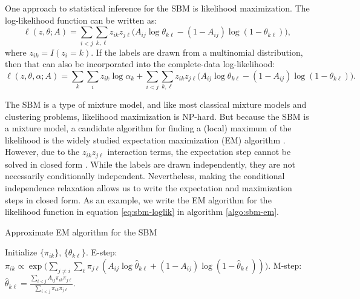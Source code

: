 \documentclass[
  12pt,
]{article}
\theoremstyle{definition}
\theoremstyle{definition}
\theoremstyle{definition}
\theoremstyle{definition}
\theoremstyle{remark}
\begin{document}
One approach to statistical inference for the SBM is likelihood maximization.
The log-likelihood function can be written as:
\begin{equation}
\label{eq:sbm-loglik}
\ell(z, \theta; A) = \sum_{i < j} \sum_{k, \ell} z_{ik} z_{j \ell} \big( 
A_{ij} \log \theta_{k \ell} - (1 - A_{ij}) \log (1 - \theta_{k \ell}) \big),
\end{equation}
where \(z_{ik} = I(z_i = k)\). If the labels are drawn from a multinomial distribution, then that can also be incorporated into the complete-data log-likelihood:
\begin{equation}
\label{eq:sbm-loglik-full}
\ell(z, \theta, \alpha; A) = \sum_k \sum_i z_{ik} \log \alpha_k + 
\sum_{i < j} \sum_{k, \ell} z_{ik} z_{j \ell} \big( 
A_{ij} \log \theta_{k \ell} - (1 - A_{ij}) \log (1 - \theta_{k \ell}) \big).
\end{equation}

The SBM is a type of mixture model, and like most classical mixture models and clustering problems, likelihood maximization is NP-hard.
But because the SBM is a mixture model, a candidate algorithm for finding a (local) maximum of the likelihood is the widely studied expectation maximization (EM) algorithm \citep{10.2307/2984875}.
However, due to the \(z_{ik} z_{j \ell}\) interaction terms, the expectation step cannot be solved in closed form \citep{kolaczyk2014statistical}.
While the labels are drawn independently, they are not necessarily conditionally independent.
Nevertheless, making the conditional independence relaxation allows us to write the expectation and maximization steps in closed form.
As an example, we write the EM algorithm for the likelihood function in equation \eqref{eq:sbm-loglik} in algorithm \ref{algo:sbm-em}.

\begin{algorithm}
\label{algo:sbm-em}
\DontPrintSemicolon
\SetAlgoLined
{}
\caption{Approximate EM algorithm for the SBM}
Initialize $\{\pi_{ik}\}$, $\{\theta_{k \ell}\}$.\;
\While{$\|\nabla \ell\| > \epsilon$} {
 {
 {
E-step: $\pi_{ik} \propto \exp \bigg( \sum_{j \neq i} \sum_{\ell} \pi_{j \ell} (A_{ij} \log \hat{\theta}_{k \ell} + (1 - A_{ij}) \log (1 - \hat{\theta}_{k \ell})) \bigg)$.\;
M-step: $\hat{\theta}_{k \ell} = \frac{\sum_{i < j} A_{ij} \pi_{ik} \pi_{j \ell}}{\sum_{i < j} \pi_{ik} \pi_{j \ell}}$.\;
}
}
}
\end{algorithm}
\end{document}
